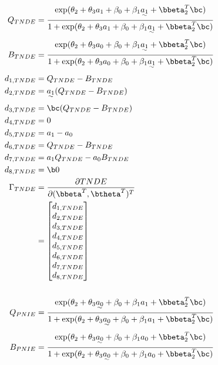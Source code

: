 \documentclass[10pt]{article}
\begin{document}
\begin{align*}
  \\
  Q_{TNDE} &= \frac
             {    \exp(\theta_{2} + \theta_{3}a_{1} + \beta_{0} + \beta_{1}\uwave{a_{1}} + \bbeta_{2}^{T}\bc)}
             {1 + \exp(\theta_{2} + \theta_{3}a_{1} + \beta_{0} + \beta_{1}\uwave{a_{1}} + \bbeta_{2}^{T}\bc)}\\
  B_{TNDE} &= \frac
             {    \exp(\theta_{2} + \theta_{3}a_{0} + \beta_{0} + \beta_{1}\uwave{a_{1}} + \bbeta_{2}^{T}\bc)}
             {1 + \exp(\theta_{2} + \theta_{3}a_{0} + \beta_{0} + \beta_{1}\uwave{a_{1}} + \bbeta_{2}^{T}\bc)}\\
      d_{1,TNDE} &= Q_{TNDE} - B_{TNDE}\\
      d_{2,TNDE} &= \uwave{a_{1}} (Q_{TNDE} - B_{TNDE})\\
      d_{3,TNDE} &= \bc (Q_{TNDE} - B_{TNDE})\\
      d_{4,TNDE} &= 0\\
      d_{5,TNDE} &= a_{1} - a_{0}\\
      d_{6,TNDE} &= Q_{TNDE} - B_{TNDE}\\
      d_{7,TNDE} &= a_{1}Q_{TNDE} - a_{0}B_{TNDE}\\
      d_{8,TNDE} &= \b0\\
  \Gamma_{TNDE}
  &= \frac{\partial TNDE}{\partial (\bbeta^{T},\btheta^{T})^{T}}\\
  &= \begin{bmatrix}
      d_{1,TNDE}\\
      d_{2,TNDE}\\
      d_{3,TNDE}\\
      d_{4,TNDE}\\
      d_{5,TNDE}\\
      d_{6,TNDE}\\
      d_{7,TNDE}\\
      d_{8,TNDE}\\
    \end{bmatrix}\\
  \\
  Q_{PNIE} &= \frac
      {    \exp(\theta_{2} + \theta_{3}\uwave{a_{0}} + \beta_{0} + \beta_{1}a_{1} + \bbeta_{2}^{T}\bc)}
      {1 + \exp(\theta_{2} + \theta_{3}\uwave{a_{0}} + \beta_{0} + \beta_{1}a_{1} + \bbeta_{2}^{T}\bc)}\\
  B_{PNIE} &= \frac
      {    \exp(\theta_{2} + \theta_{3}\uwave{a_{0}} + \beta_{0} + \beta_{1}a_{0} + \bbeta_{2}^{T}\bc)}
      {1 + \exp(\theta_{2} + \theta_{3}\uwave{a_{0}} + \beta_{0} + \beta_{1}a_{0} + \bbeta_{2}^{T}\bc)}\\

\end{align*}
\end{document}
